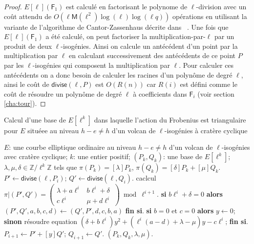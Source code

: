 \documentclass[10pt,a4paper]{book}
\theoremstyle{plain}
\theoremstyle{definition}
\theoremstyle{definition}
\theoremstyle{definition}
\theoremstyle{definition}
\theoremstyle{remark}
\theoremstyle{remark}
\theoremstyle{definition}
\begin{document}
\begin{proof}
$E[\ell](\mathsf{F}_1)$ est calculé en factorisant le polynome de 
$\ell$-division 
avec un coût attendu de $O(\ell \mathsf{M}(\ell^2)\log(\ell)\log(\ell q))$
opérations en utilisant la variante de l'algorithme de Cantor-Zassenhaus 
décrite dans ~\cite[Chapter~14.5]{vzGJG03}.
  Une fois que $E[\ell](\mathsf{F}_1)$ a été calculé, on peut factoriser la
  multiplication-par-$\ell$ par un produit de deux $\ell$-isogénies. Ainsi on
   calcule un antécédent d'un point par la multiplication par $\ell$ en 
   calculant successivement des antécédents de ce point $P$ par les 
   $\ell$-isogénies  qui composent la multiplication par $\ell$. Pour calculer 
   ces antécédents on a donc besoin de calculer les racines d'un polynôme de 
   degré $\ell$, ainsi le coût de $\mathsf{divise}(\ell,P)$ est $O(R(n))$ car 
   $R(i)$ est défini comme le coût de résoudre un polynôme de degré $\ell$ à 
   coefficients dans $\mathsf{F}_i$ (voir section \ref{cha:tour}).  
\end{proof}

\begin{algorithm}
\caption{\label{alg:bas:tri}Calcul d'une base de $E[\ell^k]$ dans laquelle l'action du Frobenius est triangulaire pour $E$ situéee au niveau $h-e \neq h$ d'un volcan de $\ell$-isogénies à cratère cyclique}
\begin{algorithmic}[1]
\REQUIRE $E$: une courbe elliptique ordinaire au niveau $h-e \neq h$ d'un volcan de $\ell$-isogénies avec cratère cyclique;
$k$: une entier positif;
\ENSURE $(P_k, Q_k )$: une base de $E[\ell^k]$;
$\lambda, \mu, \delta \in \mathbb{Z}/\ell^k \mathbb{Z}$
tels que $\pi(P_k)= [\lambda] P_k$, $ \pi(Q_k)=[\delta] P_k +  [\mu] Q_k$.
\STATE\label{alg:point:divide}
  $P' \leftarrow \mathsf{divise}(\ell, P_{i})$; $Q' \leftarrow \mathsf{divise} (\ell, Q_{i})$.
\STATE\label{alg:trigonal:frobenius}
  caclcul $\pi|(P',Q')=\left( \begin{smallmatrix}
\lambda + a\ell^{i} & b\ell^{i} + \delta \\
c\ell^{i} & \mu + d\ell^{i} \end{smallmatrix} \right) \bmod {\ell^{i+1}}.$
\STATE 
  \textbf{si} $b \ell^i + \delta=0$ \textbf{alors} $(P',Q',a,b,c,d) \leftarrow (Q',P',d,c,b,a) $  \textbf{fin si}.
\STATE
  \textbf{si} $b = 0$ et $c=0$ \textbf{alors} $y \leftarrow 0$;
\STATE\label{alg:trigonal:solve1}
  \textbf{sinon} résoudre equation
 $( \delta + b \ell^i) y^2 + (\ell^i(a-d)+\lambda - \mu)y - c\ell^i $; \textbf{fin si}.
\STATE
  $P_{i+1} \leftarrow P' + [y] Q'$; $Q_{i+1} \leftarrow  Q'$.
\ENDFOR
\RETURN $(P_{k},Q_{k},\lambda,\mu).$
\end{algorithmic}
\end{algorithm}
\end{document}
